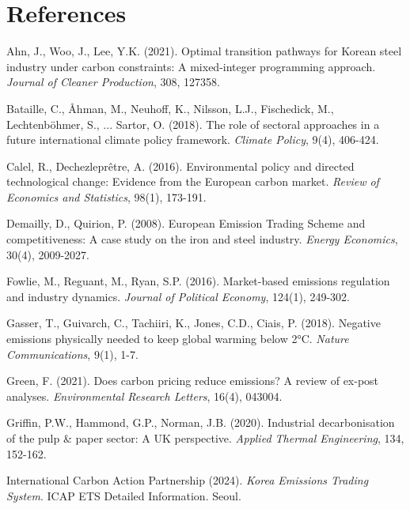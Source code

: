 \documentclass[preprint,1p,authoryear]{elsarticle}
\begin{document}
\section*{References}
\begin{thebibliography}{99}

 Ahn, J., Woo, J., Lee, Y.K. (2021). Optimal transition pathways for Korean steel industry under carbon constraints: A mixed-integer programming approach. \textit{Journal of Cleaner Production}, 308, 127358.

 Bataille, C., Åhman, M., Neuhoff, K., Nilsson, L.J., Fischedick, M., Lechtenböhmer, S., ... Sartor, O. (2018). The role of sectoral approaches in a future international climate policy framework. \textit{Climate Policy}, 9(4), 406-424.

 Calel, R., Dechezleprêtre, A. (2016). Environmental policy and directed technological change: Evidence from the European carbon market. \textit{Review of Economics and Statistics}, 98(1), 173-191.

 Demailly, D., Quirion, P. (2008). European Emission Trading Scheme and competitiveness: A case study on the iron and steel industry. \textit{Energy Economics}, 30(4), 2009-2027.

 Fowlie, M., Reguant, M., Ryan, S.P. (2016). Market-based emissions regulation and industry dynamics. \textit{Journal of Political Economy}, 124(1), 249-302.

 Gasser, T., Guivarch, C., Tachiiri, K., Jones, C.D., Ciais, P. (2018). Negative emissions physically needed to keep global warming below 2°C. \textit{Nature Communications}, 9(1), 1-7.

 Green, F. (2021). Does carbon pricing reduce emissions? A review of ex-post analyses. \textit{Environmental Research Letters}, 16(4), 043004.

 Griffin, P.W., Hammond, G.P., Norman, J.B. (2020). Industrial decarbonisation of the pulp \& paper sector: A UK perspective. \textit{Applied Thermal Engineering}, 134, 152-162.

 International Carbon Action Partnership (2024). \textit{Korea Emissions Trading System}. ICAP ETS Detailed Information. Seoul.


\end{thebibliography}
\end{document}
